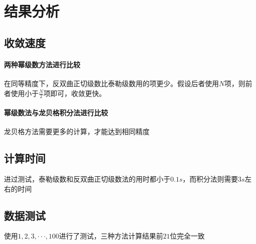 \documentclass[UTF8,twocolum,titlepage]{ctexart}
\begin{document}
\section*{结果分析}
\subsection*{收敛速度}
\paragraph{两种幂级数方法进行比较}
在同等精度下，反双曲正切级数比泰勒级数用的项更少。假设后者使用$N$项，则前者使用小于$\frac{N}{2}$项即可，收敛更快。
\paragraph{幂级数法与龙贝格积分法进行比较}
龙贝格方法需要更多的计算，才能达到相同精度
\subsection*{计算时间}
进过测试，泰勒级数和反双曲正切级数法的用时都小于$0.1s$，而积分法则需要$3s$左右的时间
\subsection*{数据测试}
使用$1,2,3,\cdot\cdot\cdot,100$进行了测试，三种方法计算结果前$21$位完全一致
\newpage
\renewcommand\refname{参考文献}


\end{document}
